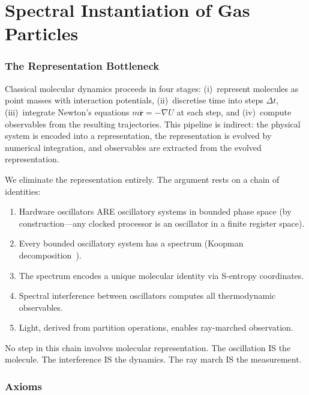 \documentclass[twocolumn,10pt,a4paper]{article}
\theoremstyle{plain}
\theoremstyle{definition}
\theoremstyle{remark}
\begin{document}

\part{Spectral Instantiation of Gas Particles}
\label{part:instantiation}

\section{The Representation Bottleneck}
\label{sec:bottleneck}

Classical molecular dynamics proceeds in four stages: (i)~represent molecules as point masses with interaction potentials, (ii)~discretise time into steps $\Delta t$, (iii)~integrate Newton's equations $m\ddot{\mathbf{r}} = -\nabla U$ at each step, and (iv)~compute observables from the resulting trajectories. This pipeline is indirect: the physical system is encoded into a representation, the representation is evolved by numerical integration, and observables are extracted from the evolved representation.

We eliminate the representation entirely. The argument rests on a chain of identities:
\begin{enumerate}
    \item Hardware oscillators ARE oscillatory systems in bounded phase space (by construction---any clocked processor is an oscillator in a finite register space).
    \item Every bounded oscillatory system has a spectrum (Koopman decomposition~\cite{koopman1931}).
    \item The spectrum encodes a unique molecular identity via S-entropy coordinates.
    \item Spectral interference between oscillators computes all thermodynamic observables.
    \item Light, derived from partition operations, enables ray-marched observation.
\end{enumerate}

No step in this chain involves molecular representation. The oscillation IS the molecule. The interference IS the dynamics. The ray march IS the measurement.

\section{Axioms}
\label{sec:axioms}
\end{document}
